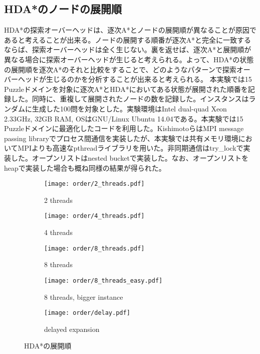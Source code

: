 \documentclass[uplatex]{jsarticle}
\begin{document}
\subsection{HDA*のノードの展開順}
HDA*の探索オーバーヘッドは、逐次A*とノードの展開順が異なることが原因であると考えることが出来る。ノードの展開する順番が逐次A*と完全に一致するならば、探索オーバーヘッドは全く生じない。裏を返せば、逐次A*と展開順が異なる場合に探索オーバーヘッドが生じると考えられる。よって、HDA*の状態の展開順を逐次A*のそれと比較をすることで、どのようなパターンで探索オーバーヘッドが生じるのかを分析することが出来ると考えられる。
本実験では15 Puzzleドメインを対象に逐次A*とHDA*においてある状態が展開された順番を記録した。同時に、重複して展開されたノードの数を記録した。インスタンスはランダムに生成した100問を対象とした。実験環境はIntel dual-quad Xeon 2.33GHz, 32GB RAM, OSはGNU/Linux Ubuntu 14.04である。本実験では15 Puzzleドメインに最適化したコードを利用した。KishimotoらはMPI message passing libraryでプロセス間通信を実装したが、本実験では共有メモリ環境においてMPIよりも高速なpthreadライブラリを用いた。非同期通信はtry\_lockで実装した。オープンリストはnested bucketで実装した。なお、オープンリストをheapで実装した場合も概ね同様の結果が得られた。
\newline

\begin{figure}[h]
	\centering
	\begin{subfigure}{0.45\columnwidth}
		\centering
		\texttt{[image: order/2\_threads.pdf]}
		\caption{2 threads}
		\label{fig:order_2_threads}
	\end{subfigure}
	\begin{subfigure}{0.45\columnwidth}
		\centering
		\texttt{[image: order/4\_threads.pdf]}
		\caption{4 threads}
		\label{fig:order_4_threads}
	\end{subfigure}
	\begin{subfigure}{0.45\columnwidth}
		\centering
		\texttt{[image: order/8\_threads.pdf]}
		\caption{8 threads}
		\label{fig:order_8_threads}
	\end{subfigure}
	\begin{subfigure}{0.45\columnwidth}
		\centering
		\texttt{[image: order/8\_threads\_easy.pdf]}
		\caption{8 threads, bigger instance}
		\label{fig:order_8_threads_easy}
	\end{subfigure}
	\begin{subfigure}{0.45\columnwidth}
		\centering
		\texttt{[image: order/delay.pdf]}
		\caption{delayed expansion}
		\label{fig:order_delay}
	\end{subfigure}
	\caption{HDA*の展開順}
	\label{fig:hdastar_orders}
\end{figure}
\end{document}
